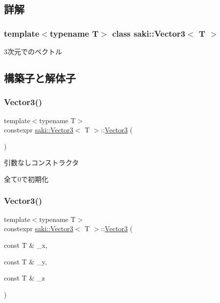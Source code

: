 \subsection{詳解}
\subsubsection*{template$<$typename T$>$\newline
class saki\+::\+Vector3$<$ T $>$}

3次元でのベクトル 

\subsection{構築子と解体子}
\mbox{\label{classsaki_1_1_vector3_a8617fe1a8d279c9673628728a0c5e5c6}} 
\subsubsection{\texorpdfstring{Vector3()}{Vector3()}\hspace{0.1cm}{\footnotesize\ttfamily [1/5]}}
{\footnotesize\ttfamily template$<$typename T$>$ \\
constexpr \mbox{\hyperlink{classsaki_1_1_vector3}{saki\+::\+Vector3}}$<$ T $>$\+::\mbox{\hyperlink{classsaki_1_1_vector3}{Vector3}} (\begin{DoxyParamCaption}{ }\end{DoxyParamCaption})\hspace{0.3cm}{\ttfamily [inline]}}



引数なしコンストラクタ 

全て0で初期化 \mbox{\label{classsaki_1_1_vector3_abaf9038ebdc4895d7df1319b6234d790}} 
\subsubsection{\texorpdfstring{Vector3()}{Vector3()}\hspace{0.1cm}{\footnotesize\ttfamily [2/5]}}
{\footnotesize\ttfamily template$<$typename T$>$ \\
constexpr \mbox{\hyperlink{classsaki_1_1_vector3}{saki\+::\+Vector3}}$<$ T $>$\+::\mbox{\hyperlink{classsaki_1_1_vector3}{Vector3}} (\begin{DoxyParamCaption}\item[{const T \&}]{\+\_\+x,  }\item[{const T \&}]{\+\_\+y,  }\item[{const T \&}]{\+\_\+z }\end{DoxyParamCaption})\hspace{0.3cm}{\ttfamily [inline]}}



